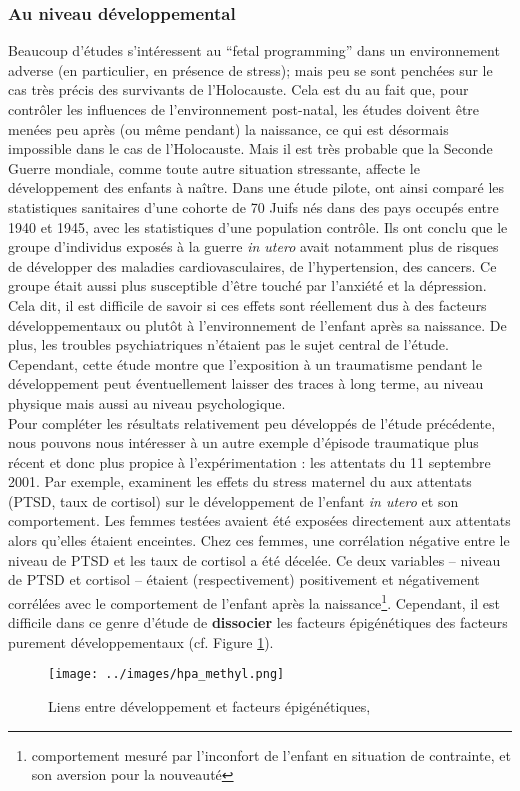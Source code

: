 \documentclass[french]{article}
\begin{document}
		\subsubsection{Au niveau développemental}
			Beaucoup d'études s'intéressent au ``fetal programming'' dans un environnement adverse (en particulier, en présence de stress); mais peu se sont penchées sur le cas très précis des survivants de l'Holocauste. Cela est du au fait que, pour contrôler les influences de l'environnement post-natal, les études doivent être menées peu après (ou même pendant) la naissance, ce qui est désormais impossible dans le cas de l'Holocauste. Mais il est très probable que la Seconde Guerre mondiale, comme toute autre situation stressante, affecte le développement des enfants à naître. Dans une étude pilote, \cite{bercovich2014} ont ainsi comparé les statistiques sanitaires d'une cohorte de 70 Juifs nés dans des pays occupés entre 1940 et 1945, avec les statistiques d'une population contrôle. Ils ont conclu que le groupe d'individus exposés à la guerre \textit{in utero} avait notamment plus de risques de développer des maladies cardiovasculaires, de l'hypertension, des cancers. Ce groupe était aussi plus susceptible d'être touché par l'anxiété et la dépression. Cela dit, il est difficile de savoir si ces effets sont réellement dus à des facteurs développementaux ou plutôt à l'environnement de l'enfant après sa naissance. De plus, les troubles psychiatriques n'étaient pas le sujet central de l'étude.
			Cependant, cette étude montre que l'exposition à un traumatisme pendant le développement peut éventuellement laisser des traces à long terme, au niveau physique mais aussi au niveau psychologique.\\
			
			Pour compléter les résultats relativement peu développés de l'étude précédente, nous pouvons nous intéresser à un autre exemple d'épisode traumatique plus récent et donc plus propice à l'expérimentation : les attentats du 11 septembre 2001. Par exemple, \cite{brand2006} examinent les effets du stress maternel du aux attentats (PTSD, taux de cortisol) sur le développement de l'enfant \textit{in utero} et son comportement. Les femmes testées avaient été exposées directement aux attentats alors qu'elles étaient enceintes. Chez ces femmes, une corrélation négative entre le niveau de PTSD et les taux de cortisol a été décelée. Ce deux variables -- niveau de PTSD et cortisol -- étaient (respectivement) positivement et négativement corrélées avec le comportement de l'enfant après la naissance\footnote{comportement mesuré par l'inconfort de l'enfant en situation de contrainte, et son aversion pour la nouveauté}. Cependant, il est difficile dans ce genre d'étude de \textbf{dissocier} les facteurs épigénétiques des facteurs purement développementaux (cf. Figure \ref{fig:dev_gen}).
			\begin{figure}[H]
				\centering
				\texttt{[image: ../images/hpa\_methyl.png]}
				\caption{Liens entre développement et facteurs épigénétiques, \cite{vaiserman2017}}
				\label{fig:dev_gen}
			\end{figure}
	
\end{document}
